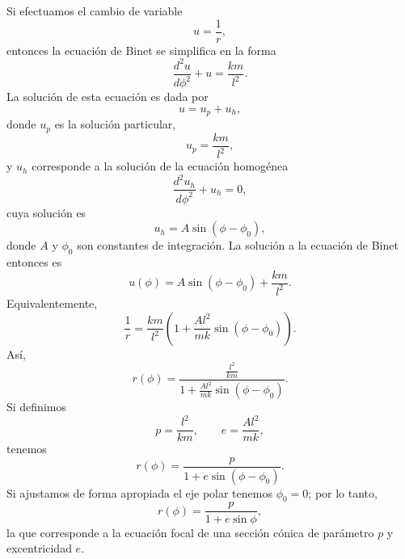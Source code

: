 \documentclass[../apunte_mecanica_clasica.tex]{subfiles}%
\begin{document}
Si efectuamos el cambio de variable
\begin{equation}
    u=\frac{1}{r},
    \label{eq:fcbk-kepler-u}
\end{equation}
entonces la ecuación de Binet se simplifica en la forma
\begin{equation}
    \frac{d^2u}{d\phi^2}+u=\frac{km}{l^2}.
    \label{eq:fcbk-kepler-u-edo}
\end{equation}
La solución de esta ecuación es dada por
\begin{equation}
    u=u_p+u_h,
    \label{eq:fcbk-kepler-u-general}
\end{equation}
donde $u_p$ es la solución particular,
\begin{equation}
    u_p=\frac{km}{l^2},
    \label{eq:fcbk-kepler-up}
\end{equation}
y $u_h$ corresponde a la solución de la ecuación homogénea
\begin{equation}
    \frac{d^2u_h}{d\phi^2}+u_h=0,
    \label{eq:fcbk-kepler-uh-edo}
\end{equation}
cuya solución es
\begin{equation}
    u_h=A\sin(\phi-\phi_0),
    \label{eq:fcbk-kepler-uh}
\end{equation}
donde $A$ y $\phi_0$ son constantes de integración. La solución a la ecuación de Binet entonces es
\begin{equation}
    u(\phi)=A\sin(\phi-\phi_0)+\frac{km}{l^2}.
    \label{eq:fcbk-kepler-u-sol}
\end{equation}
Equivalentemente,
\begin{equation}
    \frac{1}{r}=\frac{km}{l^2}\left(1+\frac{Al^2}{mk}\sin(\phi-\phi_0)\right).
    \label{eq:fcbk-kepler-inversa-r}
\end{equation}
Así,
\begin{equation}
    r(\phi)=\frac{\frac{l^2}{km}}{1+\frac{Al^2}{mk}\sin(\phi-\phi_0)}.
    \label{eq:fcbk-kepler-r-sol-intermedia}
\end{equation}
Si definimos
\begin{equation}
    p=\frac{l^2}{km},
    \qquad
    e=\frac{Al^2}{mk},
    \label{eq:fcbk-kepler-p-e-def}
\end{equation}
tenemos
\begin{equation}
    r(\phi)=\frac{p}{1+e\sin(\phi-\phi_0)}.
    \label{eq:fcbk-kepler-r-conica-general}
\end{equation}
Si ajustamos de forma apropiada el eje polar tenemos $\phi_0=0$; por lo tanto,
\begin{equation}
    r(\phi)=\frac{p}{1+e\sin\phi},
    \label{eq:fcbk-kepler-r-conica}
\end{equation}
la que corresponde a la ecuación focal de una sección cónica de parámetro $p$ y excentricidad $e$.
\end{document}
